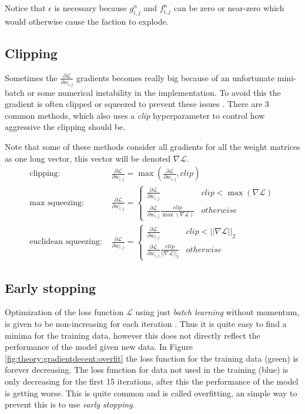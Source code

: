 Notice that $\epsilon$ is necessary because $g_{i,j}^n$ and $f_{i,j}^n$ can be zero or near-zero which would otherwise cause the faction to explode.

\subsection{Clipping}

Sometimes the $\frac{\partial \mathcal{L}}{\partial w_{i,j}}$ gradients becomes really big because of an unfortunate mini-batch or some numerical instability in the implementation. To avoid this the gradient is often clipped or squeezed to prevent these issues \cite{graves-generating-sequences}. There are 3 common methods, which also uses a \textit{clip} hyperparameter to control how aggressive the clipping should be.

Note that some of these methods consider all gradients for all the weight matrices as one long vector, this vector will be denoted $\nabla \mathcal{L}$.
\begin{align}
\text{clipping: } & \frac{\partial \mathcal{L}}{\partial w_{i,j}} = \max\left(\frac{\partial \mathcal{L}}{\partial w_{i,j}}, clip\right) \\
\text{max squeezing: } & \frac{\partial \mathcal{L}}{\partial w_{i,j}} = \begin{cases}
	\frac{\partial \mathcal{L}}{\partial w_{i,j}} & clip < \max(\nabla \mathcal{L}) \\
	\frac{\partial \mathcal{L}}{\partial w_{i,j}} \frac{clip}{\max(\nabla \mathcal{L})} & otherwise
\end{cases} \\
\text{euclidean squeezing: } & \frac{\partial \mathcal{L}}{\partial w_{i,j}} = \begin{cases}
	\frac{\partial \mathcal{L}}{\partial w_{i,j}} & clip < ||\nabla \mathcal{L}||_2 \\
	\frac{\partial \mathcal{L}}{\partial w_{i,j}} \frac{clip}{||\nabla \mathcal{L}||_2} & otherwise
\end{cases}
\end{align}

\subsection{Early stopping}

Optimization of the loss function $\mathcal{L}$ using just \textit{batch learning} without momentum, is given to be non-increasing for each iteration \cite{bishop}. Thus it is quite easy to find a minima for the training data, however this does not directly reflect the performance of the model given new data. In Figure \ref{fig:theory:gradientdecent:overfit} the loss function for the training data (green) is forever decreasing. The loss function for data not used in the training (blue) is only decreasing for the first 15 iterations, after this the performance of the model is getting worse. This is quite common and is called overfitting, an simple way to prevent this is to use \textit{early stopping}.

